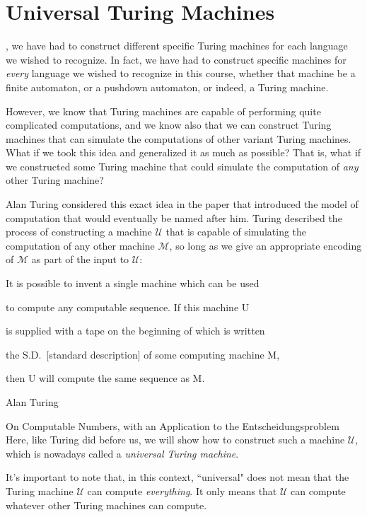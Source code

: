 \section{Universal Turing Machines}\label{sec:universalturingmachines}

, we have had to construct different specific Turing machines for each language we wished to recognize. In fact, we have had to construct specific machines for \emph{every} language we wished to recognize in this course, whether that machine be a finite automaton, or a pushdown automaton, or indeed, a Turing machine.

However, we know that Turing machines are capable of performing quite complicated computations, and we know also that we can construct Turing machines that can simulate the computations of other variant Turing machines. What if we took this idea and generalized it as much as possible? That is, what if we constructed some Turing machine that could simulate the computation of \emph{any} other Turing machine?

Alan Turing considered this exact idea in the paper that introduced the model of computation that would eventually be named after him. Turing described the process of constructing a machine $\mathcal{U}$ that is capable of simulating the computation of any other machine $\mathcal{M}$, so long as we give an appropriate encoding of $\mathcal{M}$ as part of the input to $\mathcal{U}$: \par
\epigraph{It is possible to invent a single machine which can be used \par
to compute any computable sequence. If this machine U \par
is supplied with a tape on the beginning of which is written \par
the S.D.\ [standard description] of some computing machine M, \par
then U will compute the same sequence as M.}{Alan Turing}{On Computable Numbers, with an Application to the Entscheidungsproblem}{}
\vspace{1em}
\noindent
Here, like Turing did before us, we will show how to construct such a machine $\mathcal{U}$, which is nowadays called a \emph{universal Turing machine}.

\begin{remark}
It's important to note that, in this context, ``universal" does not mean that the Turing machine $\mathcal{U}$ can compute \emph{everything}. It only means that $\mathcal{U}$ can compute whatever other Turing machines can compute.
\end{remark}


